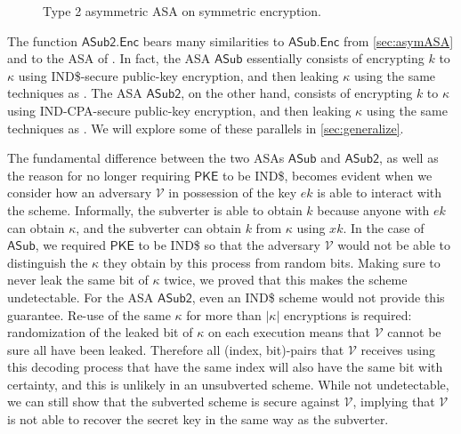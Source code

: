 \begin{wrapfigure}{R}{0.4\textwidth}
\centering
{}
\caption[Type 2 asymmetric ASA on symmetric encryption]{Type 2 asymmetric ASA on symmetric encryption.}
\label{figure:asymsubv2}
\end{wrapfigure}

The function $\mathsf{ASub2.Enc}$ bears many similarities to $\mathsf{ASub.Enc}$ from \autoref{sec:asymASA} and to the ASA of \cite{CCS:BelJaeKan15}. In fact, the ASA $\mathsf{ASub}$ essentially consists of encrypting $k$ to $\kappa$ using IND\$-secure public-key encryption, and then leaking $\kappa$ using the same techniques as \cite{C:BelPatRog14}. The ASA $\mathsf{ASub2}$, on the other hand, consists of encrypting $k$ to $\kappa$ using IND-CPA-secure public-key encryption, and then leaking $\kappa$ using the same techniques as \cite{CCS:BelJaeKan15}. We will explore some of these parallels in \autoref{sec:generalize}.

The fundamental difference between the two ASAs $\mathsf{ASub}$ and $\mathsf{ASub2}$, as well as the reason for no longer requiring $\mathsf{PKE}$ to be IND\$, becomes evident when we consider how an adversary $\mathcal{V}$ in possession of the key $ek$ is able to interact with the scheme. Informally, the subverter is able to obtain $k$ because anyone with $ek$ can obtain $\kappa$, and the subverter can obtain $k$ from $\kappa$ using $xk$. In the case of $\mathsf{ASub}$, we required $\mathsf{PKE}$ to be IND\$ so that the adversary $\mathcal{V}$ would not be able to distinguish the $\kappa$ they obtain by this process from random bits. Making sure to never leak the same bit of $\kappa$ twice, we proved that this makes the scheme undetectable. For the ASA $\mathsf{ASub2}$, even an IND\$ scheme would not provide this guarantee. Re-use of the same $\kappa$ for more than $|\kappa|$ encryptions is required: randomization of the leaked bit of $\kappa$ on each execution means that $\mathcal{V}$ cannot be sure all have been leaked. Therefore all (index, bit)-pairs that $\mathcal{V}$ receives using this decoding process that have the same index will also have the same bit with certainty, and this is unlikely in an unsubverted scheme. While not undetectable, we can still show that the subverted scheme is secure against $\mathcal{V}$, implying that $\mathcal{V}$ is not able to recover the secret key in the same way as the subverter.

